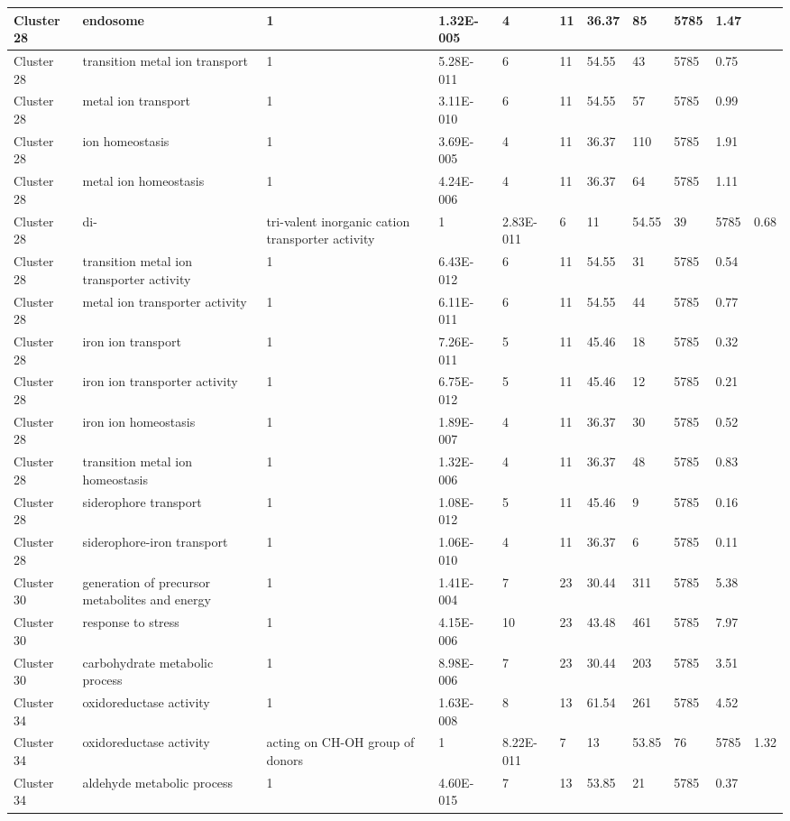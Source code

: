 \begin{tabular}{|l|l|l|l|l|l|l|l|l|l|l|}
\hline
Cluster 28&endosome&1&1.32E-005&4&11&36.37&85&5785&1.47&\\
\hline
Cluster 28&transition metal ion transport&1&5.28E-011&6&11&54.55&43&5785&0.75&\\
\hline
Cluster 28&metal ion transport&1&3.11E-010&6&11&54.55&57&5785&0.99&\\
\hline
Cluster 28&ion homeostasis&1&3.69E-005&4&11&36.37&110&5785&1.91&\\
\hline
Cluster 28&metal ion homeostasis&1&4.24E-006&4&11&36.37&64&5785&1.11&\\
\hline
Cluster 28&di-& tri-valent inorganic cation transporter activity&1&2.83E-011&6&11&54.55&39&5785&0.68\\
\hline
Cluster 28&transition metal ion transporter activity&1&6.43E-012&6&11&54.55&31&5785&0.54&\\
\hline
Cluster 28&metal ion transporter activity&1&6.11E-011&6&11&54.55&44&5785&0.77&\\
\hline
Cluster 28&iron ion transport&1&7.26E-011&5&11&45.46&18&5785&0.32&\\
\hline
Cluster 28&iron ion transporter activity&1&6.75E-012&5&11&45.46&12&5785&0.21&\\
\hline
Cluster 28&iron ion homeostasis&1&1.89E-007&4&11&36.37&30&5785&0.52&\\
\hline
Cluster 28&transition metal ion homeostasis&1&1.32E-006&4&11&36.37&48&5785&0.83&\\
\hline
Cluster 28&siderophore transport&1&1.08E-012&5&11&45.46&9&5785&0.16&\\
\hline
Cluster 28&siderophore-iron transport&1&1.06E-010&4&11&36.37&6&5785&0.11&\\
\hline
Cluster 30&generation of precursor metabolites and energy&1&1.41E-004&7&23&30.44&311&5785&5.38&\\
\hline
Cluster 30&response to stress&1&4.15E-006&10&23&43.48&461&5785&7.97&\\
\hline
Cluster 30&carbohydrate metabolic process&1&8.98E-006&7&23&30.44&203&5785&3.51&\\
\hline
Cluster 34&oxidoreductase activity&1&1.63E-008&8&13&61.54&261&5785&4.52&\\
\hline
Cluster 34&oxidoreductase activity& acting on CH-OH group of donors&1&8.22E-011&7&13&53.85&76&5785&1.32\\
\hline
Cluster 34&aldehyde metabolic process&1&4.60E-015&7&13&53.85&21&5785&0.37&\\

\end{tabular}
